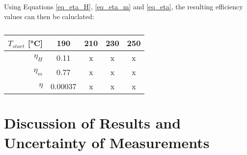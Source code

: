 \documentclass[titlepage]{article}
\begin{document}
Using Equations \ref{eq_eta_H}, \ref{eq_eta_m} and \ref{eq_eta}, the resulting efficiency values can then be caluclated:

\begin{table}[H]
    \centering
    \caption{}
    \label{tb_efficiency_values}
    \begin{tabular}{|r||c|c|c|c|}
        \hline
        \(T_{start}\) [°C] & \textbf{190} & \textbf{210} & \textbf{230} & \textbf{250}
        \\
        \hline
        \hline
        \(\eta_H\) & 0.11 & x & x & x
        \\
        \hline
        \(\eta_m\) & 0.77 & x & x & x
        \\
        \hline
        \(\eta\) & 0.00037 & x & x & x
        \\
        \hline
    \end{tabular}
\end{table}

\newpage
\section{Discussion of Results and Uncertainty of Measurements}

\end{document}
